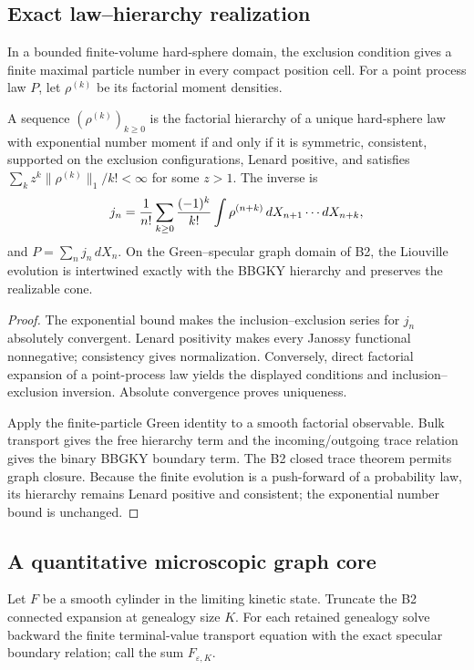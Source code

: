 \subsection{Exact law--hierarchy realization}

In a bounded finite-volume hard-sphere domain, the exclusion condition gives
a finite maximal particle number in every compact position cell.  For a point
process law $P$, let $\rho^{(k)}$ be its factorial moment densities.

\begin{theorem}
\label{thm:r21-b4-intertwiner}
A sequence $(\rho^{(k)})_{k\ge0}$ is the factorial hierarchy of a unique
hard-sphere law with exponential number moment if and only if it is symmetric,
consistent, supported on the exclusion configurations, Lenard positive, and
satisfies
$\sum_k z^k\|\rho^{(k)}\|_1/k!<\infty$ for some $z>1$.  The inverse is
\[
 j_n={1\over n!}\sum_{k\ge0}{(-1)^k\over k!}
 \int\rho^{(n+k)}\,dX_{n+1}\cdots dX_{n+k},
\]
and $P=\sum_nj_n\,dX_n$.  On the Green--specular graph domain of B2, the
Liouville evolution is intertwined exactly with the BBGKY hierarchy and
preserves the realizable cone.
\end{theorem}

\begin{proof}
The exponential bound makes the inclusion--exclusion series for $j_n$
absolutely convergent.  Lenard positivity makes every Janossy functional
nonnegative; consistency gives normalization.  Conversely, direct factorial
expansion of a point-process law yields the displayed conditions and
inclusion--exclusion inversion.  Absolute convergence proves uniqueness.

Apply the finite-particle Green identity to a smooth factorial observable.
Bulk transport gives the free hierarchy term and the incoming/outgoing trace
relation gives the binary BBGKY boundary term.  The B2 closed trace theorem
permits graph closure.  Because the finite evolution is a push-forward of a
probability law, its hierarchy remains Lenard positive and consistent; the
exponential number bound is unchanged.
\end{proof}

\subsection{A quantitative microscopic graph core}

Let $F$ be a smooth cylinder in the limiting kinetic state.  Truncate the B2
connected expansion at genealogy size $K$.  For each retained genealogy solve
backward the finite terminal-value transport equation with the exact specular
boundary relation; call the sum $F_{\varepsilon,K}$.

